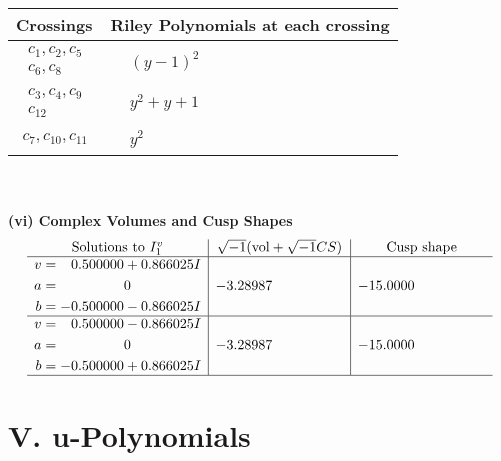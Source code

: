 \documentclass[1p]{elsarticle_modified}
\theoremstyle{definition}
\newcommand{\I}{\sqrt{-1}}
\begin{document}
\begin{tabular}{m{50pt}|m{274pt}}
Crossings & \hspace{64pt}Riley Polynomials at each crossing \\
\hline $$\begin{aligned}c_{1},c_{2},c_{5}\\c_{6},c_{8}\end{aligned}$$&$\begin{aligned}
&(y-1)^2
\end{aligned}$\\
\hline $$\begin{aligned}c_{3},c_{4},c_{9}\\c_{12}\end{aligned}$$&$\begin{aligned}
&y^2+y+1
\end{aligned}$\\
\hline $$\begin{aligned}c_{7},c_{10},c_{11}\end{aligned}$$&$\begin{aligned}
&y^2
\end{aligned}$\\
\hline
\end{tabular}\\~\\
\newpage\flushleft \textbf{(vi) Complex Volumes and Cusp Shapes}
$$\begin{array}{c|c|c}  
\text{Solutions to }I^v_{1}& \I (\text{vol} + \sqrt{-1}CS) & \text{Cusp shape}\\
 \hline 
\begin{aligned}
v &= \phantom{-}0.500000 + 0.866025 I \\
a &= \phantom{-0.000000 } 0 \\
b &= -0.500000 - 0.866025 I\end{aligned}
 & -3.28987\phantom{ +0.000000I} & -15.0000\phantom{ +0.000000I} \\ \hline\begin{aligned}
v &= \phantom{-}0.500000 - 0.866025 I \\
a &= \phantom{-0.000000 } 0 \\
b &= -0.500000 + 0.866025 I\end{aligned}
 & -3.28987\phantom{ +0.000000I} & -15.0000\phantom{ +0.000000I}\\
 \hline 
 \end{array}$$\newpage
\newpage\renewcommand{\arraystretch}{1}
\centering \section*{ V. u-Polynomials}
\end{document}
